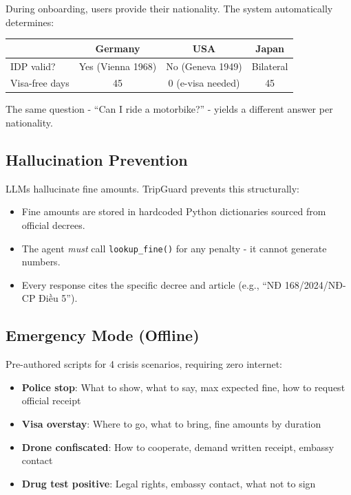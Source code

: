 \documentclass[conference, onecolumn]{IEEEtran}
\begin{document}
During onboarding, users provide their nationality. The system automatically determines:

\begin{table}[H]
\centering
\begin{tabular}{@{}lccc@{}}
\toprule
& \textbf{Germany} & \textbf{USA} & \textbf{Japan} \\
\midrule
IDP valid? & Yes (Vienna 1968) & No (Geneva 1949) & Bilateral \\
Visa-free days & 45 & 0 (e-visa needed) & 45 \\
\bottomrule
\end{tabular}
\end{table}

The same question - ``Can I ride a motorbike?'' - yields a different answer per nationality.

\subsection{Hallucination Prevention}

LLMs hallucinate fine amounts. TripGuard prevents this structurally:
\begin{itemize}[leftmargin=*]
    \item Fine amounts are stored in hardcoded Python dictionaries sourced from official decrees.
    \item The agent \textit{must} call \texttt{lookup\_fine()} for any penalty - it cannot generate numbers.
    \item Every response cites the specific decree and article (e.g., ``NĐ 168/2024/NĐ-CP Điều 5'').
\end{itemize}

\subsection{Emergency Mode (Offline)}

Pre-authored scripts for 4 crisis scenarios, requiring zero internet:

\begin{itemize}[leftmargin=*]
    \item \textbf{Police stop}: What to show, what to say, max expected fine, how to request official receipt
    \item \textbf{Visa overstay}: Where to go, what to bring, fine amounts by duration
    \item \textbf{Drone confiscated}: How to cooperate, demand written receipt, embassy contact
    \item \textbf{Drug test positive}: Legal rights, embassy contact, what not to sign
\end{itemize}
\end{document}
